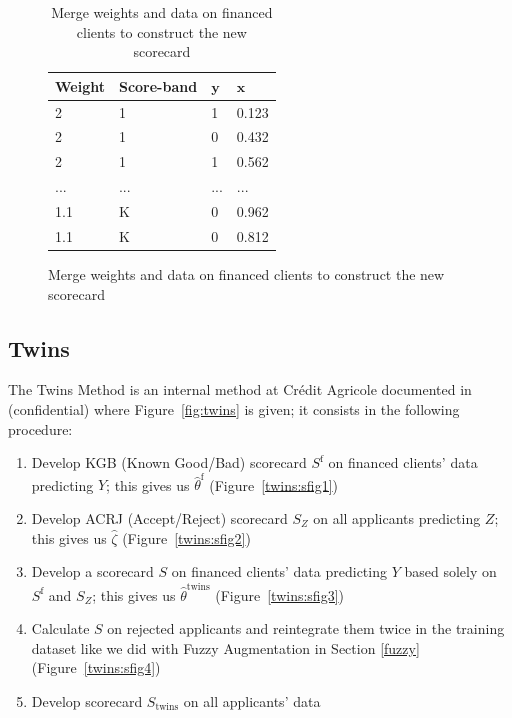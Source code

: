 \begin{table}
{\begin{multicols}{3}
\columnbreak

\begin{subfigure}[t]{0.31\textwidth}
\begin{center}
\begin{adjustbox}{max width=0.95\textwidth}

\begin{tabular}{l l l l}
\toprule
\textbf{Weight} & \textbf{Score-band} & \textbf{${\bm{y}}$} & \textbf{${\bm{x}}$}\\
\midrule
2 & 1 & 1 & 0.123 \\
2 & 1 & 0 & 0.432 \\
2 & 1 & 1 & 0.562 \\
... & ... & ... & ... \\
1.1 & K & 0 & 0.962 \\
1.1 & K & 0 & 0.812 \\
\bottomrule
\end{tabular}
\end{adjustbox}
\end{center}

\caption{Merge weights and data on financed clients to construct the new scorecard}
\label{augment:sfig3}
\end{subfigure}
\end{multicols}
}
\end{table}

\subsection{Twins} \label{Twins}

The Twins Method is an internal method at Crédit Agricole documented in~\cite{groupe} (confidential) where Figure~\ref{fig:twins} is given; it consists in the following procedure:
\begin{enumerate}
\item Develop KGB (Known Good/Bad) scorecard $S^{\text{f}}$ on financed clients' data predicting $Y$; this gives us $\hat{\theta}^{\text{f}}$ (Figure~\ref{twins:sfig1})
\item Develop ACRJ (Accept/Reject) scorecard $S_Z$ on all applicants predicting $Z$; this gives us $\hat{\zeta}$ (Figure~\ref{twins:sfig2})
\item Develop a scorecard $S$ on financed clients' data predicting $Y$ based solely on $S^{\text{f}}$ and $S_Z$; this gives us $\hat{\theta}^{\text{twins}}$ (Figure~\ref{twins:sfig3})
\item Calculate $S$ on rejected applicants and reintegrate them twice in the training dataset like we did with Fuzzy Augmentation in Section \ref{fuzzy} (Figure~\ref{twins:sfig4})
\item Develop scorecard $S_{\text{twins}}$ on all applicants' data
\end{enumerate}

